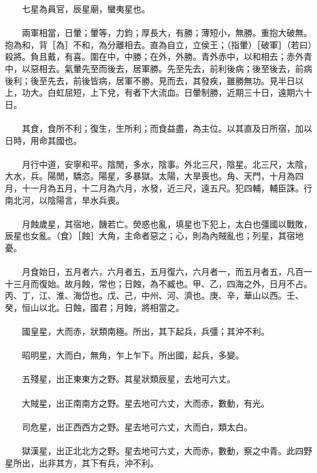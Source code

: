 　　七星為員官，辰星廟，蠻夷星也。
\\\\
　　兩軍相當，日暈；暈等，力鈞；厚長大，有勝；薄短小，無勝。重抱大破無。抱為和，背［為］不和，為分離相去。直為自立，立侯王；（指暈）［破軍］（若曰）殺將。負且戴，有喜。圍在中，中勝；在外，外勝。青外赤中，以和相去；赤外青中，以惡相去。氣暈先至而後去，居軍勝。先至先去，前利後病；後至後去，前病後利；後至先去，前後皆病，居軍不勝。見而去，其發疾，雖勝無功。見半日以上，功大。白虹屈短，上下兌，有者下大流血。日暈制勝，近期三十日，遠期六十日。
\\\\
　　其食，食所不利；復生，生所利；而食益盡，為主位。以其直及日所宿，加以日時，用命其國也。
\\\\
　　月行中道，安寧和平。陰閒，多水，陰事。外北三尺，陰星。北三尺，太陰，大水，兵。陽閒，驕恣。陽星，多暴獄。太陽，大旱喪也。角、天門，十月為四月，十一月為五月，十二月為六月，水發，近三尺，遠五尺。犯四輔，輔臣誅。行南北河，以陰陽言，旱水兵喪。
\\\\
　　月蝕歲星，其宿地，饑若亡。熒惑也亂，填星也下犯上，太白也彊國以戰敗，辰星也女亂。（食）［蝕］大角，主命者惡之；心，則為內賊亂也；列星，其宿地憂。
\\\\
　　月食始日，五月者六，六月者五，五月復六，六月者一，而五月者五，凡百一十三月而復始。故月蝕，常也；日蝕，為不臧也。甲、乙，四海之外，日月不占。丙、丁，江、淮、海岱也。戊、己，中州、河、濟也。庚、辛，華山以西。壬、癸，恒山以北。日蝕，國君；月蝕，將相當之。
\\\\
　　國皇星，大而赤，狀類南極。所出，其下起兵，兵彊；其沖不利。
\\\\
　　昭明星，大而白，無角，乍上乍下。所出國，起兵，多變。
\\\\
　　五殘星，出正東東方之野。其星狀類辰星，去地可六丈。
\\\\
　　大賊星，出正南南方之野。星去地可六丈，大而赤，數動，有光。
\\\\
　　司危星，出正西西方之野。星去地可六丈，大而白，類太白。
\\\\
　　獄漢星，出正北北方之野。星去地可六丈，大而赤，數動，察之中青。此四野星所出，出非其方，其下有兵，沖不利。
\\\\
